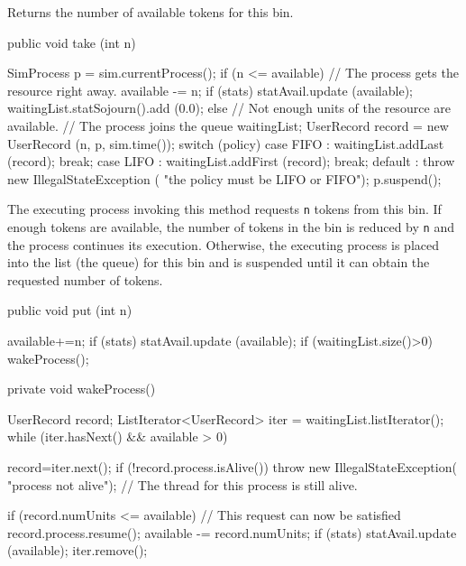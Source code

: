  \begin{tabb}  Returns the number of available tokens for this bin.
 \end{tabb}
\begin{htmlonly}
\end{htmlonly}
\begin{code}

   public void take (int n) \begin{hide} {
        SimProcess p = sim.currentProcess();
        if (n <= available) {
            // The process gets the resource right away.
            available -= n;
            if (stats) {
               statAvail.update (available);
               waitingList.statSojourn().add (0.0);
            }
        }
        else {
            // Not enough units of the resource are available.
            // The process joins the queue waitingList;
            UserRecord record = new UserRecord (n, p, sim.time());
            switch (policy) {
                case FIFO : waitingList.addLast (record); break;
                case LIFO : waitingList.addFirst (record); break;
                default   : throw new IllegalStateException (
                                       "the policy must be LIFO or FIFO");
            }
            p.suspend();
        }
   }\end{hide}
\end{code}
 \begin{tabb}  The executing process invoking this method requests
   \texttt{n} tokens from this bin.  If enough tokens are available,
   the number of tokens in the bin is reduced by \texttt{n} and the
   process continues its execution.
   Otherwise, the executing process is placed into the
    list (the queue) for this bin and is suspended
   until it can obtain the requested number of tokens.
 \end{tabb}
\begin{htmlonly}
\end{htmlonly}
\begin{code}

   public void put (int n) \begin{hide} {
        available+=n;
        if (stats) statAvail.update (available);
        if (waitingList.size()>0)  wakeProcess();
   }

   private void wakeProcess() {

        UserRecord record;
        ListIterator<UserRecord> iter = waitingList.listIterator();
        while (iter.hasNext() && available > 0) {
            record=iter.next();
            if (!record.process.isAlive())
                throw new IllegalStateException(
                           "process not alive");
                // The thread for this process is still alive.

            if (record.numUnits <= available) {
                // This request can now be satisfied
                record.process.resume();
                available -= record.numUnits;
                if (stats) statAvail.update (available);
                iter.remove();
            }
        }
    } \end{hide}
\end{code}

